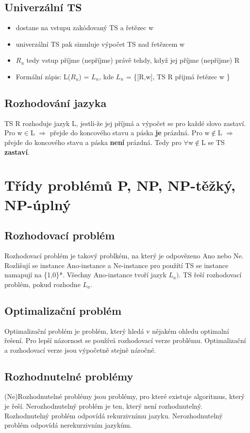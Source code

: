 \documentclass{szzclass}
\begin{document}
\subsection{Univerzální TS}
\begin{itemize}
    \item dostane na vstupu zakódovaný TS a řetězec w
    \item univerzální TS pak simuluje výpočet TS nad řetězcem w
    \item $R_u$ tedy vstup příjme (nepříjme) právě tehdy, když jej příjme (nepříjme) R
    \item Formální zápis: L($R_u$) = $L_n$, kde $L_n$ = \{[R,w], TS R přijmá řetězec w \}
\end{itemize}
\subsection{Rozhodování jazyka}
TS R rozhoduje jazyk L, jestli-že jej příjmá a výpočet se pro každé slovo zastaví.
\newline
Pro w$\in$L $\Rightarrow$ přejde do koncového stavu a páska \textbf{je} prázdná.
\newline
Pro w$\notin$L $\Rightarrow$ přejde do koncového stavu a páska \textbf{není} prázdná.
\newline
Tedy pro $\forall$w$\notin$L se TS \textbf{zastaví}. 


\section{Třídy problémů P, NP, NP-těžký, NP-úplný}
\subsection{Rozhodovací problém}
Rozhodovací problém je takový problkém, na který je odpovězeno Ano nebo Ne. Rozlišují se instance Ano-instance a Ne-instance
pro použítí TS se instance namapují na \{1,0\}*. Všechny Ano-instance tvoří jazyk $L_a)$. TS řeší rozhodovací problém, pokud rozhodne $L_a$.
\subsection{Optimalizační problém}
Optimalizační problém je problém, který hledá v nějakém ohledu optimalní řešení. Pro lepší názornost se používá rozhodovací verze problému.
Optimalizační a rozhodovací verze jsou výpočetně stejně náročné.
\subsection{Rozhodnutelné problémy}
(Ne)Rozhodnutelné problémy jsou problémy, pro které existuje algoritmus, který je řeší. Nerozhodnutelný problém je ten, který není rozhodnutelný.
\newline
Rozhodnutelný problém odpovídá rekurzivnímu jazyku.
\newline
Nerozhodnutelný problém odpovídá nerekurzivním jazykům.
\end{document}
